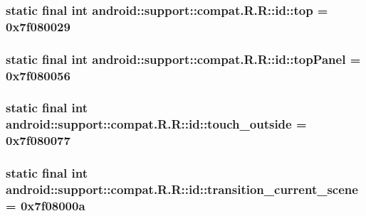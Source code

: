 \hypertarget{classandroid_1_1support_1_1compat_1_1_r_1_1id_1738364199d0bf553c586eb011f223ea}{
\subsubsection[{top}]{\setlength{\rightskip}{0pt plus 5cm}static final int android::support::compat.R.R::id::top = 0x7f080029}}
\label{classandroid_1_1support_1_1compat_1_1_r_1_1id_1738364199d0bf553c586eb011f223ea}


\hypertarget{classandroid_1_1support_1_1compat_1_1_r_1_1id_924d0697e915462cec41e951596fb600}{
\subsubsection[{topPanel}]{\setlength{\rightskip}{0pt plus 5cm}static final int android::support::compat.R.R::id::topPanel = 0x7f080056}}
\label{classandroid_1_1support_1_1compat_1_1_r_1_1id_924d0697e915462cec41e951596fb600}


\hypertarget{classandroid_1_1support_1_1compat_1_1_r_1_1id_34bcd51d1914e1cd7d6f92e1a72de756}{
\subsubsection[{touch\_\-outside}]{\setlength{\rightskip}{0pt plus 5cm}static final int android::support::compat.R.R::id::touch\_\-outside = 0x7f080077}}
\label{classandroid_1_1support_1_1compat_1_1_r_1_1id_34bcd51d1914e1cd7d6f92e1a72de756}


\hypertarget{classandroid_1_1support_1_1compat_1_1_r_1_1id_3416bc6e384055920442f173afb87904}{
\subsubsection[{transition\_\-current\_\-scene}]{\setlength{\rightskip}{0pt plus 5cm}static final int android::support::compat.R.R::id::transition\_\-current\_\-scene = 0x7f08000a}}
\label{classandroid_1_1support_1_1compat_1_1_r_1_1id_3416bc6e384055920442f173afb87904}


